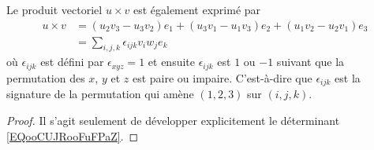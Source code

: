 \begin{lemma}
	Le produit vectoriel \( u\times v\) est également exprimé par
	\begin{subequations}        \label{EQSooOWGZooNYruoy}
		\begin{align}
			u\times v & =(u_2v_3-u_3v_2)e_1+(u_3v_1-u_1v_3)e_2+(u_1v_2-u_2v_1)e_3     \label{SEBEQooVROKooRpUOIr} \\
			          & =\sum_{i,j,k}\epsilon_{ijk}v_iw_je_k
		\end{align}
	\end{subequations}
	où \( \epsilon_{ijk}\) est défini par \( \epsilon_{xyz}=1\) et ensuite \( \epsilon_{ijk}\) est \( 1\) ou \( -1\) suivant que la permutation des \( x\), \( y\) et \( z\) est paire ou impaire. C'est-à-dire que \( \epsilon_{ijk}\) est la signature de la permutation qui amène \( (1,2,3)\) sur \( (i,j,k)\).
\end{lemma}

\begin{proof}
	Il s'agit seulement de développer explicitement le déterminant \eqref{EQooCUJRooFuFPaZ}.
\end{proof}


